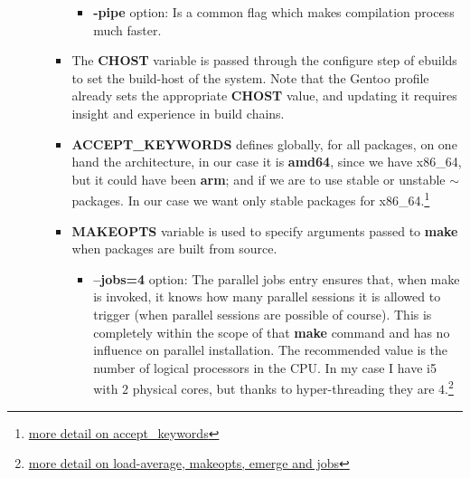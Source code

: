 \documentclass[10pt,a4paper]{article}
\begin{document}
\begin{enumerate}
\begin{enumerate}[label*=\arabic*.]
\begin{itemize}
\begin{itemize}[label={o}]
					\item \textbf{-pipe} option: Is a common flag which makes compilation process much faster.
				\end{itemize}
				
				\item The \textbf{CHOST} variable is passed through the configure step of ebuilds to set the build-host of the system. Note that the Gentoo profile already sets the appropriate \textbf{CHOST} value, and updating it requires insight and experience in build chains. 

				
				
				\item \textbf{ACCEPT\_KEYWORDS} defines globally, for all packages, on one hand the architecture, in our case it is \textbf{amd64}, since we have x86\_64, but it could have been \textbf{arm}; and if we are to use stable or unstable \textbf{$ \sim $} packages. In our case we want only stable packages for x86\_64.\footnote{ \href{https://wiki.gentoo.org/wiki/ACCEPT_KEYWORDS}{more detail on accept\_keywords}}

				
				
				\item \textbf{MAKEOPTS} variable is used to specify arguments passed to \textbf{make} when packages are built from source.

				
				
				\begin{itemize}[label={o}]
					
					\item \textbf{--jobs=4} option: The parallel jobs entry ensures that, when make is invoked, it knows how many parallel sessions it is allowed to trigger (when parallel sessions are possible of course). This is completely within the scope of that \textbf{make} command and has no influence on parallel installation. The recommended value is the number of logical processors in the CPU. In my case I have i5 with $ 2 $ physical cores, but thanks to hyper-threading they are $ 4 $.\footnote{ \label{jobs-load-avg-details} \href{https://lists.gt.net/gentoo/user/269934}{more detail on load-average, makeopts, emerge and jobs}}
					

\end{itemize}
\end{itemize}
\end{enumerate}
\end{enumerate}
\end{document}

